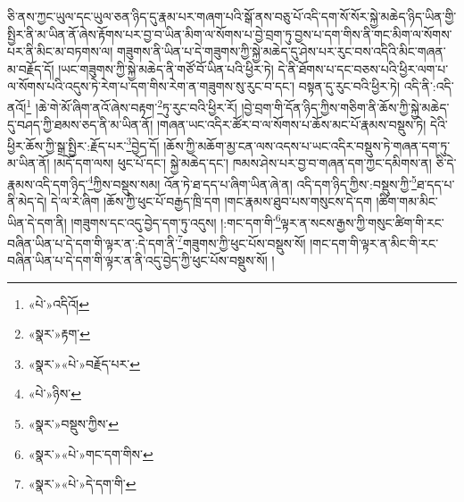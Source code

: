 ཅི་ནས་ཀྱང་ཡུལ་དང་ཡུལ་ཅན་ཉིད་དུ་རྣམ་པར་གཞག་པའི་སྒོ་ནས་བཅུ་པོ་འདི་དག་སོ་སོར་སྐྱེ་མཆེད་ཉིད་ཡིན་གྱི་སྤྱིར་ནི་མ་ཡིན་ནོ་ཞེས་རྟོགས་པར་བྱ་བ་ཡིན་མིག་ལ་སོགས་པ་བྱེ་བྲག་ཏུ་བྱས་པ་དག་གིས་ནི་གང་མིག་ལ་སོགས་པར་ནི་མིང་མ་བཏགས་ལ། གཟུགས་ནི་ཡིན་པ་དེ་གཟུགས་ཀྱི་སྐྱེ་མཆེད་དུ་ཤེས་པར་རུང་བས་འདིའི་མིང་གཞན་མ་བརྗོད་དོ། །ཡང་གཟུགས་ཀྱི་སྐྱེ་མཆེད་ནི་གཙོ་བོ་ཡིན་པའི་ཕྱིར་ཏེ། དེ་ནི་ཐོགས་པ་དང་བཅས་པའི་ཕྱིར་ལག་པ་ལ་སོགས་པའི་འདུས་ཏེ་རེག་པ་དག་གིས་རེག་ན་གཟུགས་སུ་རུང་བ་དང་། བསྟན་དུ་རུང་བའི་ཕྱིར་ཏེ། འདི་ནི་:འདི་ནའོ།\footnote{«པེ་»འདིའོ།} །ཆེ་གེ་མོ་ཞིག་ནའོ་ཞེས་བརྟག་\footnote{«སྣར་»རྟག་}ཏུ་རུང་བའི་ཕྱིར་རོ། །བྱེ་བྲག་གི་དོན་ཉིད་ཀྱིས་གཅིག་ནི་ཆོས་ཀྱི་སྐྱེ་མཆེད་དུ་བཤད་ཀྱི་ཐམས་ཅད་ནི་མ་ཡིན་ནོ། །གཞན་ཡང་འདིར་ཚོར་བ་ལ་སོགས་པ་ཆོས་མང་པོ་རྣམས་བསྡུས་ཏེ། དེའི་ཕྱིར་ཆོས་ཀྱི་སྒྲ་སྤྱིར་:རྗོད་པར་\footnote{«སྣར་»«པེ་»བརྗོད་པར་}བྱེད་དོ། །ཆོས་ཀྱི་མཆོག་མྱ་ངན་ལས་འདས་པ་ཡང་འདིར་བསྡུས་ཏེ་གཞན་དག་ཏུ་མ་ཡིན་ནོ། །མདོ་དག་ལས། ཕུང་པོ་དང་། སྐྱེ་མཆེད་དང་། ཁམས་ཤེས་པར་བྱ་བ་གཞན་དག་ཀྱང་དམིགས་ན། ཅི་དེ་རྣམས་འདི་དག་ཉིད་\footnote{«པེ་»ཉིས་}ཀྱིས་བསྡུས་སམ། འོན་ཏེ་ཐ་དད་པ་ཞིག་ཡིན་ཞེ་ན། འདི་དག་ཉིད་ཀྱིས་:བསྡུས་ཀྱི་\footnote{«སྣར་»བསྡུས་ཀྱིས་}ཐ་དད་པ་ནི་མེད་དེ། དེ་ལ་རེ་ཞིག །ཆོས་ཀྱི་ཕུང་པོ་བརྒྱད་ཁྲི་དག །གང་རྣམས་ཐུབ་པས་གསུངས་དེ་དག །ཚིག་གམ་མིང་ཡིན་དེ་དག་ནི། །གཟུགས་དང་འདུ་བྱེད་དག་ཏུ་འདུས། །:གང་དག་གི་\footnote{«སྣར་»«པེ་»གང་དག་གིས་}ལྟར་ན་སངས་རྒྱས་ཀྱི་གསུང་ཚིག་གི་རང་བཞིན་ཡིན་པ་དེ་དག་གི་ལྟར་ན་:དེ་དག་ནི་\footnote{«སྣར་»«པེ་»དེ་དག་གི་}གཟུགས་ཀྱི་ཕུང་པོས་བསྡུས་སོ། །གང་དག་གི་ལྟར་ན་མིང་གི་རང་བཞིན་ཡིན་པ་དེ་དག་གི་ལྟར་ན་ནི་འདུ་བྱེད་ཀྱི་ཕུང་པོས་བསྡུས་སོ། །
